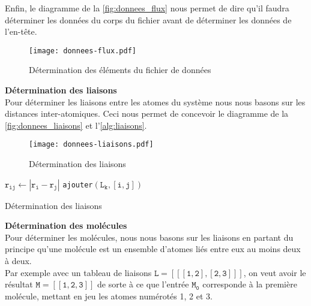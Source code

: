 Enfin, le diagramme de la \autoref{fig:donnees_flux} nous permet de dire qu'il faudra déterminer les données du corps du fichier avant de déterminer les données de l'en-tête.

\begin{figure}[h!]
	\centering
	\texttt{[image: donnees-flux.pdf]}
	\caption{Détermination des éléments du fichier de données}
	\label{fig:donnees_flux}
\end{figure}

\textbf{Détermination des liaisons}\\
Pour déterminer les liaisons entre les atomes du système nous nous basons sur les distances inter-atomiques. Ceci nous permet de concevoir le diagramme de la \autoref{fig:donnees_liaisons} et l'\autoref{alg:liaisons}.

\begin{figure}[h!]
	\centering
	\texttt{[image: donnees-liaisons.pdf]}
	\caption{Détermination des liaisons}
	\label{fig:donnees_liaisons}
\end{figure}

\begin{algorithm}[h!]
	\Deb%
	{
		{
			{
				$\mathtt{r_{ij} \gets |r_i - r_j|}$\;
				{
					{
						\texttt{ajouter}$\mathtt{(L_k, [i, j])}$\;
					}
				}
			}
		}
	}
	\caption{Détermination des liaisons}
	\label{alg:liaisons}
\end{algorithm}

\textbf{Détermination des molécules}\\
Pour déterminer les molécules, nous nous basons sur les liaisons en partant du principe qu'une molécule est un ensemble d'atomes liés entre eux au moins deux à deux.\\
Par exemple avec un tableau de liaisons $\mathtt{L = [[[1, 2], [2, 3]]]}$, on veut avoir le résultat $\mathtt{M = [[1, 2, 3]]}$ de sorte à ce que l'entrée $\mathtt{M_0}$ corresponde à la première molécule, mettant en jeu les atomes numérotés \num{1}, \num{2} et \num{3}.

